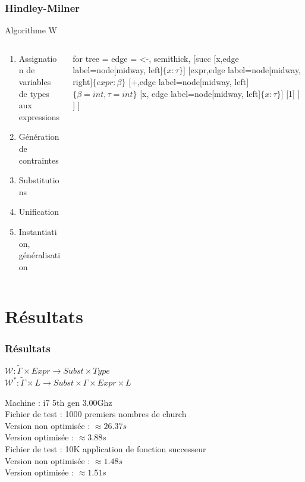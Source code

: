 \documentclass{beamer}
\begin{document}
\begin{frame}
		\frametitle{Hindley-Milner}
		Algorithme W
		\begin{columns}
				\begin{column}{0.5\textwidth}
						\begin{enumerate}
								\item Assignation de variables de types aux expressions
								\item Génération de contraintes
								\item Substitutions
								\item Unification
								\item Instantiation, généralisation
						\end{enumerate}
				\end{column}
				\begin{column}{0.5\textwidth}
						\begin{forest}
								for tree = {
										edge = {<-, semithick},
								}
								[succ
								[x,edge label={node[midway, left]{$\{x:\tau\}$}}]
										[expr,edge label={node[midway, right]{$\{expr:\beta\}$}}
												[+,edge label={node[midway, left]{$\{\beta = int, \tau = int\}$}}
														[x, edge label={node[midway, left]{$\{x:\tau\}$}}]
														[1]	
												]
										]
								]
						\end{forest}
				\end{column}
		\end{columns}
\end{frame}

\section{Résultats}
\begin{frame}[t]
		\frametitle{Résultats}
		
		\begin{center}
				$\mathcal W : \tilde \Gamma \times Expr \to Subst \times Type$\\
				$\mathcal W^* : \tilde \Gamma \times L \to Subst \times \Gamma \times Expr \times L $	
		\end{center}
		
		Machine : i7 5th gen 3.00Ghz\\
		\vspace{5mm}
		Fichier de test : 1000 premiers nombres de church\\
		Version non optimisée : $\approx 26.37s$\\
		Version optimisée : $\approx 3.88s$\\
		\vspace{5mm}
		Fichier de test : 10K application de fonction successeur\\
		Version non optimisée : $\approx 1.48s$\\
		Version optimisée : $\approx 1.51s$
\end{frame}
\end{document}
